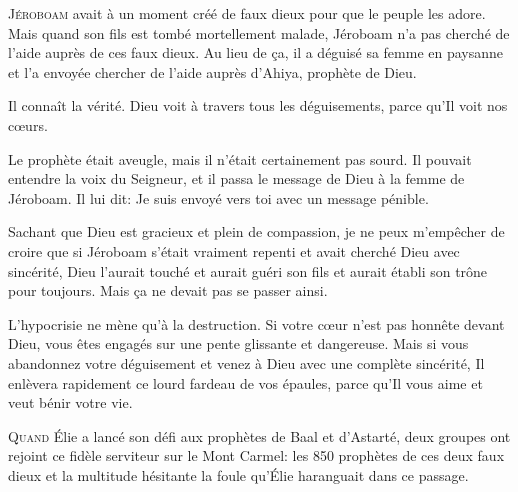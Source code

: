 \lettrine{J}{éroboam} avait à un moment créé de faux dieux
 pour que le peuple les adore.
 Mais quand son fils est tombé mortellement malade,
 Jéroboam n'a pas cherché de l'aide auprès de ces faux dieux.
 Au lieu de \c{c}a, il a déguisé sa femme en paysanne
 et l'a envoyée chercher de l'aide auprès d'Ahiya, prophète de Dieu.


Il connaît la vérité. Dieu voit à travers tous les déguisements,
 parce qu'Il voit nos c\oe{}urs. 

Le prophète était aveugle, mais il n'était certainement pas sourd.
 Il pouvait entendre la voix du Seigneur, et il passa le message de Dieu
 à la femme de Jéroboam.  Il lui dit:
 \Og Je suis envoyé vers toi avec un message pénible. \Fg{}

Sachant que Dieu est gracieux et plein de compassion,
 je ne peux m'empêcher de croire que si Jéroboam s'était vraiment repenti
 et avait cherché Dieu avec sincérité, Dieu l'aurait touché
 et aurait guéri son fils et aurait établi son trône pour toujours.
 Mais \c{c}a ne devait pas se passer ainsi. 

L'hypocrisie ne mène qu'à la destruction.
 Si votre c\oe{}ur n'est pas honnête devant Dieu,
 vous êtes engagés sur une pente glissante et dangereuse.
 Mais si vous abandonnez votre déguisement et venez à Dieu
 avec une complète sincérité, Il enlèvera rapidement ce lourd fardeau
 de vos épaules, parce qu'Il vous aime et veut bénir votre vie. 

\dvrule






\lettrine{Q}{uand} Élie a lancé son défi aux prophètes
 de Baal et d'Astarté, deux groupes ont rejoint ce fidèle serviteur
 sur le Mont Carmel: les 850 \Og prophètes \Fg{} de ces deux faux dieux
 et la multitude hésitante
 \ocadr la foule qu'Élie haranguait dans ce passage. 

